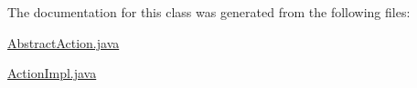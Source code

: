 The documentation for this class was generated from the following files:\begin{CompactItemize}
\item 
\hyperlink{AbstractAction_8java-source}{Abstract\-Action.java}\item 
\hyperlink{ActionImpl_8java-source}{Action\-Impl.java}\end{CompactItemize}
